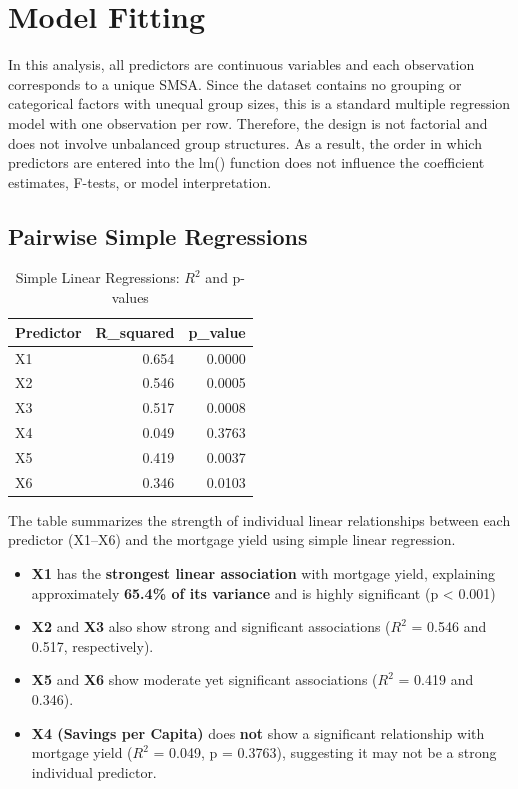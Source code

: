 \documentclass[
  11pt,
]{article}
\begin{document}
\section{Model Fitting}\label{model-fitting}

In this analysis, all predictors are continuous variables and each
observation corresponds to a unique SMSA. Since the dataset contains no
grouping or categorical factors with unequal group sizes, this is a
standard multiple regression model with one observation per row.
Therefore, the design is not factorial and does not involve unbalanced
group structures. As a result, the order in which predictors are entered
into the lm() function does not influence the coefficient estimates,
F-tests, or model interpretation.

\subsection{Pairwise Simple
Regressions}\label{pairwise-simple-regressions}

\begingroup\fontsize{8}{10}\selectfont

\begin{longtable}[t]{lrr}
\caption{\label{tab:unnamed-chunk-8}Simple Linear Regressions: $R^2$ and p-values}\\
\toprule
Predictor & R\_squared & p\_value\\
\midrule
X1 & 0.654 & 0.0000\\
X2 & 0.546 & 0.0005\\
X3 & 0.517 & 0.0008\\
X4 & 0.049 & 0.3763\\
X5 & 0.419 & 0.0037\\
\addlinespace
X6 & 0.346 & 0.0103\\
\bottomrule
\end{longtable}
\endgroup{}

The table summarizes the strength of individual linear relationships
between each predictor (X1--X6) and the mortgage yield using simple
linear regression.

\begin{itemize}
\item
  \textbf{X1} has the \textbf{strongest linear association} with
  mortgage yield, explaining approximately \textbf{65.4\% of its
  variance} and is highly significant (p \textless{} 0.001)
\item
  \textbf{X2} and \textbf{X3} also show strong and significant
  associations (\(R^2\) = 0.546 and 0.517, respectively).
\item
  \textbf{X5} and \textbf{X6} show moderate yet significant associations
  (\(R^2\) = 0.419 and 0.346).
\item
  \textbf{X4 (Savings per Capita)} does \textbf{not} show a significant
  relationship with mortgage yield (\(R^2\) = 0.049, p = 0.3763),
  suggesting it may not be a strong individual predictor.
\end{itemize}
\end{document}
